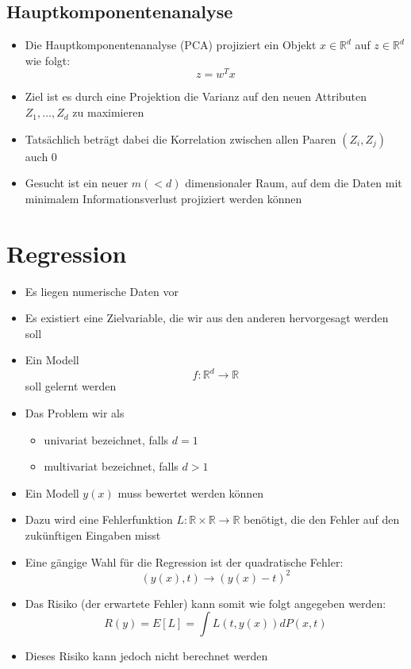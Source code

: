 \documentclass{scrartcl}
\begin{document}
\subsection{Hauptkomponentenanalyse}

\begin{itemize}
	\item Die Hauptkomponentenanalyse (PCA) projiziert ein Objekt $ x \in 
	\mathbb{R}^d $ auf $ z \in \mathbb{R}^d $ wie folgt:
	\[ z=w^Tx \]
	\item Ziel ist es durch eine Projektion die Varianz auf den neuen 
	Attributen $ Z_1,\ldots,Z_d $ zu maximieren
	\item Tatsächlich beträgt dabei die Korrelation zwischen allen Paaren $ 
	(Z_i,Z_j) $ auch 0
	\item Gesucht ist ein neuer $ m (<d) $ dimensionaler Raum, auf dem die 
	Daten mit minimalem Informationsverlust projiziert werden können
\end{itemize}

\section{Regression}

\begin{itemize}
	\item Es liegen numerische Daten vor
	\item Es existiert eine Zielvariable, die wir aus den anderen hervorgesagt 
	werden soll
	\item Ein Modell
	\[ f: \mathbb{R}^d \rightarrow \mathbb{R} \]
	soll gelernt werden
	\item Das Problem wir als
	\begin{itemize}
		\item univariat bezeichnet, falls $ d=1 $
		\item multivariat bezeichnet, falls $ d>1 $
	\end{itemize}
	\item Ein Modell $ y(x) $ muss bewertet werden können
	\item Dazu wird eine Fehlerfunktion $ L: \mathbb{R} \times \mathbb{R} 
	\rightarrow \mathbb{R} $ benötigt, die den Fehler auf den zukünftigen 
	Eingaben misst
	\item Eine gängige Wahl für die Regression ist der quadratische Fehler:
	\[ (y(x), t) \rightarrow (y(x) - t)^2 \]
	\item Das Risiko (der erwartete Fehler) kann somit wie folgt angegeben 
	werden:
	\[ R(y) = E[L] = \int L(t, y(x)) dP(x,t) \]
	\item Dieses Risiko kann jedoch nicht berechnet werden
\end{itemize}
\end{document}
